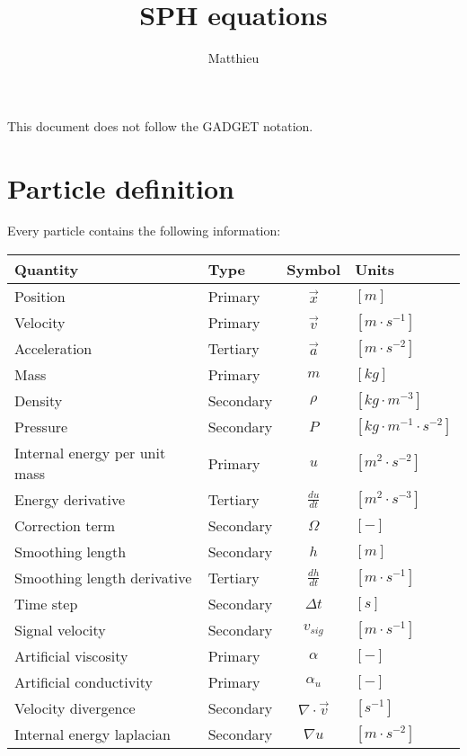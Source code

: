 \documentclass[a4paper,10pt]{article}
\title{SPH equations}
\author{Matthieu}
\begin{document}
\maketitle

This document does not follow the GADGET notation.\\

\section{Particle definition}
Every particle contains the following information:

\begin{table}[h]
\centering
\begin{tabular}{|l|l|c|l|}
 \hline
 \textbf{Quantity} & \textbf{Type} & \textbf{Symbol} & \textbf{Units} \\
 \hline \hline
 Position & Primary & $\vec{x}$ & $[m]$ \\
 Velocity & Primary &$\vec{v}$ & $[m\cdot s^{-1}]$ \\
 Acceleration & Tertiary &$\vec{a}$ & $[m\cdot s^{-2}]$ \\
 Mass & Primary &$m$ & $[kg]$ \\
 Density & Secondary & $\rho$ & $[kg\cdot m^{-3}]$ \\
 Pressure & Secondary & $P$ & $[kg \cdot m^{-1}\cdot s^{-2}]$ \\
 Internal energy per unit mass & Primary & $u$ & $[m^2 \cdot s^{-2}]$ \\ 
 Energy derivative & Tertiary & $\frac{du}{dt}$ & $[ m^2 \cdot s^{-3}]$ \\
 Correction term & Secondary & $\Omega$ & $[-]$ \\
 Smoothing length & Secondary &$h$ & $[m]$ \\
 Smoothing length derivative & Tertiary &$\frac{dh}{dt}$ & $[m\cdot s^{-1}]$ \\
 Time step & Secondary & $\Delta t$ & $[s]$ \\
 Signal velocity & Secondary & $v_{sig}$& $[m\cdot s^{-1}]$ \\
\hline
 Artificial viscosity & Primary & $\alpha$ & $[-]$\\
 Artificial conductivity & Primary & $\alpha_u$ & $[-]$\\
 Velocity divergence & Secondary & $\nabla\cdot \vec{v}$ & $[s^{-1}]$ \\
 Internal energy laplacian & Secondary & $\nabla u$ & $[m\cdot s^{-2}]$\\
\hline
\end{tabular} 
\end{table}
\end{document}
